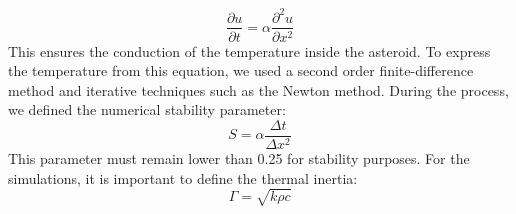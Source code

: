 \begin{equation}
    \frac{\partial{u}}{\partial{t}}=\alpha\frac{\partial^2{u}}{\partial{x}^2}
\end{equation}
This ensures the conduction of the temperature inside the asteroid. To express the temperature from this equation, we used a second order finite-difference method and iterative techniques such as the Newton method. During the process, we defined the numerical stability parameter:
\begin{equation}
    S=\alpha\frac{\Delta t}{\Delta x^2}
\end{equation}
This parameter must remain lower than 0.25 for stability purposes. For the simulations, it is important to define the thermal inertia:
\begin{equation}
    \Gamma=\sqrt{k\rho c}
\end{equation}
